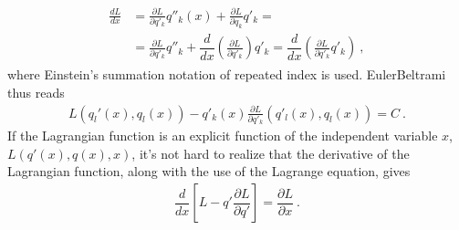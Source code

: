 \documentclass[letterpaper,10pt,english]{jupyterBook}
\begin{document}
\begin{equation*}
\begin{split}\begin{aligned}
  \frac{d L}{dx} 
  & = \frac{\partial L}{\partial q'_k} q''_k(x) + \frac{\partial L}{\partial q_k} q'_k = \\
  & = \frac{\partial L}{\partial q'_k} q''_k + \dfrac{d}{dx} \left( \frac{\partial L}{\partial q'_k} \right) q'_k 
    = \dfrac{d}{dx} \left( \frac{\partial L}{\partial q'_k} q'_k \right) \ ,
\end{aligned}\end{split}
\end{equation*}
\sphinxAtStartPar
where Einstein’s summation notation of repeated index is used. Euler\sphinxhyphen{}Beltrami thus reads
\begin{equation*}
\begin{split}L(q_l'(x),q_l(x)) - q'_k(x) \frac{\partial L}{\partial q'_k}(q'_l(x), q_l(x)) = C \  .\end{split}
\end{equation*}
\sphinxAtStartPar
{} If the Lagrangian function is an explicit function of the independent variable \(x\), \(L(q'(x), q(x), x)\), it’s not hard to realize that  the derivative of the Lagrangian function, along with the use of the Lagrange equation, gives
\begin{equation*}
\begin{split}\dfrac{d}{dx} \left[ L - q' \dfrac{\partial L}{\partial q'} \right] = \dfrac{\partial L}{\partial x} \ .\end{split}
\end{equation*}\label{ch/calculus-variations/intro:example-0}
\end{document}
